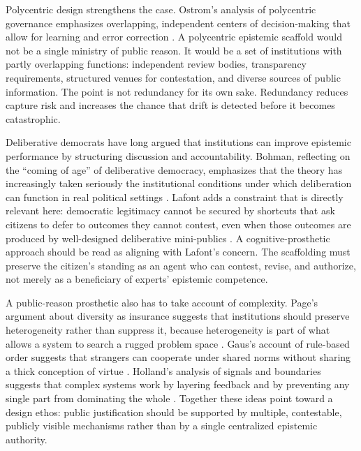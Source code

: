 \documentclass[12pt]{article}
\begin{document}
Polycentric design strengthens the case. Ostrom's analysis of polycentric governance emphasizes overlapping, independent centers of decision-making that allow for learning and error correction \parencite[p.~643]{ostrom2010polycentric}. A polycentric epistemic scaffold would not be a single ministry of public reason. It would be a set of institutions with partly overlapping functions: independent review bodies, transparency requirements, structured venues for contestation, and diverse sources of public information. The point is not redundancy for its own sake. Redundancy reduces capture risk and increases the chance that drift is detected before it becomes catastrophic.

Deliberative democrats have long argued that institutions can improve epistemic performance by structuring discussion and accountability. Bohman, reflecting on the \enquote{coming of age} of deliberative democracy, emphasizes that the theory has increasingly taken seriously the institutional conditions under which deliberation can function in real political settings \parencite[pp.~400--401]{bohman1998comingage}. Lafont adds a constraint that is directly relevant here: democratic legitimacy cannot be secured by shortcuts that ask citizens to defer to outcomes they cannot contest, even when those outcomes are produced by well-designed deliberative mini-publics \parencite[p.~3]{lafont2020democracy}. A cognitive-prosthetic approach should be read as aligning with Lafont's concern. The scaffolding must preserve the citizen's standing as an agent who can contest, revise, and authorize, not merely as a beneficiary of experts' epistemic competence.

A public-reason prosthetic also has to take account of complexity. Page's argument about diversity as insurance suggests that institutions should preserve heterogeneity rather than suppress it, because heterogeneity is part of what allows a system to search a rugged problem space \parencite[p.~130]{page2011diversity}. Gaus's account of rule-based order suggests that strangers can cooperate under shared norms without sharing a thick conception of virtue \parencite[p.~3]{gaus2016rulebased}. Holland's analysis of signals and boundaries suggests that complex systems work by layering feedback and by preventing any single part from dominating the whole \parencite[p.~2]{holland2012signals}. Together these ideas point toward a design ethos: public justification should be supported by multiple, contestable, publicly visible mechanisms rather than by a single centralized epistemic authority.
\end{document}
